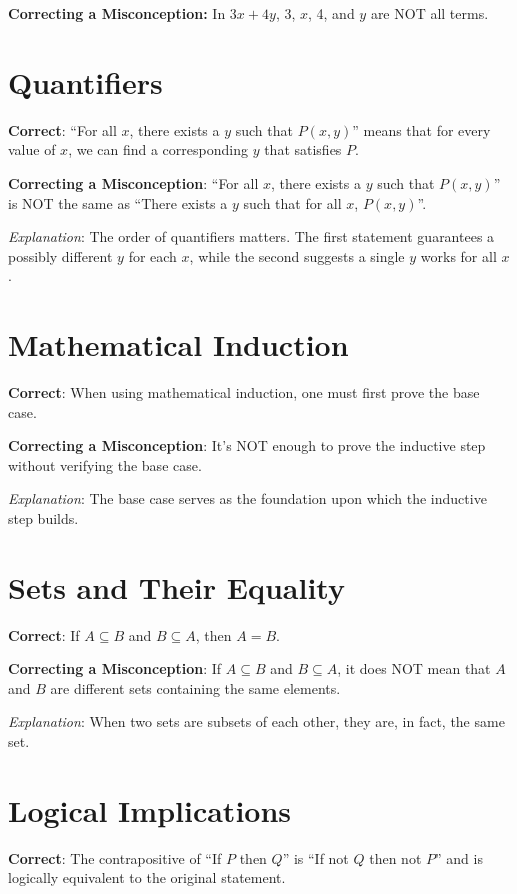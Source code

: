 \documentclass[12pt]{article}
\begin{document}
\textbf{Correcting a Misconception:} In \(3x + 4y\), 3, \(x\), 4, and \(y\) are NOT all terms.

\section*{Quantifiers}
\textbf{Correct}: ``For all \(x\), there exists a \(y\) such that \(P(x,y)\)'' means that for every value of \(x\), we can find a corresponding \(y\) that satisfies \(P\).

\textbf{Correcting a Misconception}: ``For all \(x\), there exists a \(y\) such that \(P(x,y)\)'' is NOT the same as ``There exists a \(y\) such that for all \(x\), \(P(x,y)\)''.

\textit{Explanation}: The order of quantifiers matters. The first statement guarantees a possibly different \(y\) for each \(x\), while the second suggests a single \(y\) works for all \(x\).

\section*{Mathematical Induction}
\textbf{Correct}: When using mathematical induction, one must first prove the base case.

\textbf{Correcting a Misconception}: It's NOT enough to prove the inductive step without verifying the base case.

\textit{Explanation}: The base case serves as the foundation upon which the inductive step builds.

\section*{Sets and Their Equality}
\textbf{Correct}: If \(A \subseteq B\) and \(B \subseteq A\), then \(A = B\).

\textbf{Correcting a Misconception}: If \(A \subseteq B\) and \(B \subseteq A\), it does NOT mean that \(A\) and \(B\) are different sets containing the same elements.

\textit{Explanation}: When two sets are subsets of each other, they are, in fact, the same set.

\section*{Logical Implications}
\textbf{Correct}: The contrapositive of ``If \(P\) then \(Q\)'' is ``If not \(Q\) then not \(P\)'' and is logically equivalent to the original statement.
\end{document}
